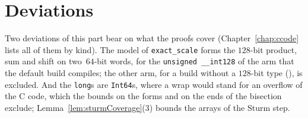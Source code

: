 \section{Deviations}\label{sec:regionDeviations}

Two deviations of this part bear on what the proofs cover (Chapter~\ref{chap:ccode} lists all of
them by kind). The model of \verb|exact_scale| forms the $128$-bit product, sum and shift on
two~$64$-bit words, for the \verb|unsigned __int128| of the arm that the default build compiles;
the other arm, for a build without a $128$-bit type (), is
excluded. And the \verb|long|s are \verb|Int64|s, where a wrap would stand for an overflow of the C
code, which the bounds on the forms and on the ends of the bisection exclude;
Lemma~\ref{lem:sturmCoverage}(3) bounds the arrays of the Sturm step.
